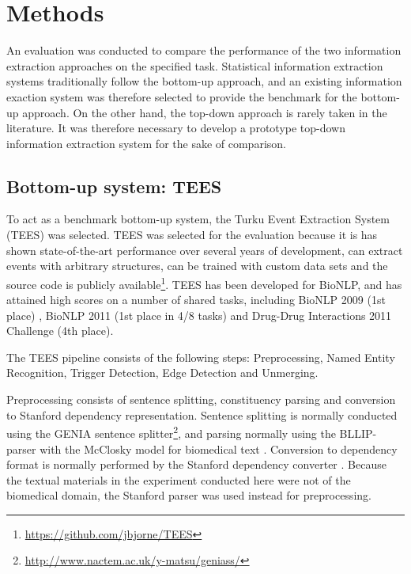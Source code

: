 \section{Methods}

An evaluation was conducted to compare the performance of the two information extraction approaches on the specified task. Statistical information extraction systems traditionally follow the bottom-up approach, and an existing information exaction system was therefore selected to provide the benchmark for the bottom-up approach. On the other hand, the top-down approach is rarely taken in the literature. It was therefore necessary to develop a prototype top-down information extraction system for the sake of comparison.

\subsection{Bottom-up system: TEES}

To act as a benchmark bottom-up system, the Turku Event Extraction System (TEES) \citep{bjo11ddi} was selected. TEES was selected for the evaluation because it is has shown state-of-the-art performance over several years of development, can extract events with arbitrary structures, can be trained with custom data sets and the source code is publicly available\footnote{\url{https://github.com/jbjorne/TEES}}. TEES has been developed for BioNLP, and has attained high scores on a number of shared tasks, including BioNLP 2009 (1st place) \citep{bjo09}, BioNLP 2011 (1st place in 4/8 tasks) \citep{bjo11} and Drug-Drug Interactions 2011 Challenge (4th place)\citep{bjo11ddi}.

The TEES pipeline consists of the following steps: Preprocessing, Named Entity Recognition, Trigger Detection, Edge Detection and Unmerging. 

Preprocessing consists of sentence splitting, constituency parsing and conversion to Stanford dependency representation. Sentence splitting is normally conducted using the GENIA sentence splitter\footnote{\url{http://www.nactem.ac.uk/y-matsu/geniass/}}, and parsing normally using the BLLIP-parser \citep{cha05} with the McClosky model for biomedical text \citep{mcc08}. Conversion to dependency format is normally performed by the Stanford dependency converter \citep{dem08}. Because the textual materials in the experiment conducted here were not of the biomedical domain, the Stanford parser \citep{kle03} was used instead for preprocessing.

